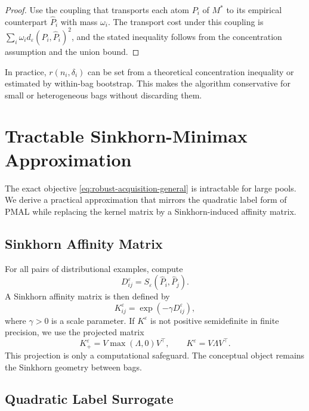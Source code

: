 \documentclass[11pt,a4paper]{article}
\begin{document}
\begin{proof}
Use the coupling that transports each atom $P_i$ of $M^*$ to its empirical counterpart $\widehat P_i$ with mass $\omega_i$. The transport cost under this coupling is $\sum_i\omega_i d_\varepsilon(P_i,\widehat P_i)^2$, and the stated inequality follows from the concentration assumption and the union bound.
\end{proof}

In practice, $r(n_i,\delta_i)$ can be set from a theoretical concentration inequality or estimated by within-bag bootstrap. This makes the algorithm conservative for small or heterogeneous bags without discarding them.

\section{Tractable Sinkhorn-Minimax Approximation}

The exact objective \eqref{eq:robust-acquisition-general} is intractable for large pools. We derive a practical approximation that mirrors the quadratic label form of PMAL while replacing the kernel matrix by a Sinkhorn-induced affinity matrix.

\subsection{Sinkhorn Affinity Matrix}

For all pairs of distributional examples, compute
\begin{equation}
D^\varepsilon_{ij}=S_\varepsilon(\widehat P_i,\widehat P_j).
\end{equation}
A Sinkhorn affinity matrix is then defined by
\begin{equation}
K^\varepsilon_{ij}=\exp(-\gamma D^\varepsilon_{ij}),
\label{eq:sinkhorn-kernel}
\end{equation}
where $\gamma>0$ is a scale parameter. If $K^\varepsilon$ is not positive semidefinite in finite precision, we use the projected matrix
\begin{equation}
K^\varepsilon_+ = V\max(\Lambda,0)V^\top,
\qquad K^\varepsilon=V\Lambda V^\top.
\label{eq:psd-projection}
\end{equation}
This projection is only a computational safeguard. The conceptual object remains the Sinkhorn geometry between bags.

\subsection{Quadratic Label Surrogate}
\end{document}
